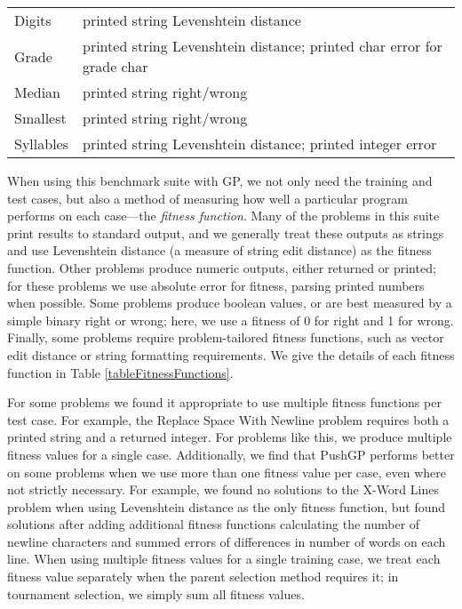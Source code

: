 \documentclass{sig-alternate}
\begin{document}
\begin{table*}[t]
\begin{tabular}{>{\raggedright}p{4cm} >{\raggedright}p{11cm}}
Digits                     & printed string Levenshtein distance                                                                                                   \tabularnewline
Grade                      & printed string Levenshtein distance; printed char error for grade char \tabularnewline
Median                     & printed string right/wrong \tabularnewline
Smallest                   & printed string right/wrong \tabularnewline
Syllables                  & printed string Levenshtein distance; printed integer error  \tabularnewline     
\bottomrule
\end{tabular}
\end{table*}

When using this benchmark suite with GP, we not only need the training and test cases, but also a method of measuring how well a particular program performs on each case---the \textit{fitness function}. 
Many of the problems in this suite print results to standard output, and we generally treat these outputs as strings and use Levenshtein distance (a measure of string edit distance) as the fitness function. Other problems produce numeric outputs, either returned or printed; for these problems we use absolute error for fitness, parsing printed numbers when possible. Some problems produce boolean values, or are best measured by a simple binary right or wrong; here, we use a fitness of 0 for right and 1 for wrong. Finally, some problems require problem-tailored fitness functions, such as vector edit distance or string formatting requirements. We give the details of each fitness function in Table \ref{tableFitnessFunctions}.

For some problems we found it appropriate to use multiple fitness functions per test case. For example, the Replace Space With Newline problem requires both a printed string and a returned integer. For problems like this, we produce multiple fitness values for a single case. Additionally, we find that PushGP performs better on some problems when we use more than one fitness value per case, even where not strictly necessary. For example, we found no solutions to the X-Word Lines problem when using Levenshtein distance as the only fitness function, but found solutions after adding additional fitness functions calculating the number of newline characters and summed errors of differences in number of words on each line. When using multiple fitness values for a single training case, we treat each fitness value separately when the parent selection method requires it; in tournament selection, we simply sum all fitness values.
\end{document}
